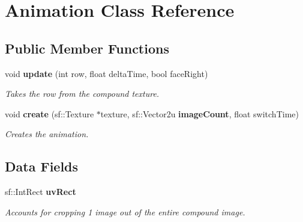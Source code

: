 \section{Animation Class Reference}
\label{classAnimation}
\subsection*{Public Member Functions}
\begin{DoxyCompactItemize}
\item 
void {\bf update} (int row, float delta\+Time, bool face\+Right)
\begin{DoxyCompactList}\small\item\em Takes the row from the compound texture. \end{DoxyCompactList}\item 
void {\bf create} (sf\+::\+Texture $\ast$texture, sf\+::\+Vector2u {\bf image\+Count}, float switch\+Time)
\begin{DoxyCompactList}\small\item\em Creates the animation. \end{DoxyCompactList}\end{DoxyCompactItemize}
\subsection*{Data Fields}
\begin{DoxyCompactItemize}
\item 
sf\+::\+Int\+Rect {\bf uv\+Rect}\label{classAnimation_a82c41dd15d9a98ecc0699ecca09fd056}

\begin{DoxyCompactList}\small\item\em Accounts for cropping 1 image out of the entire compound image. \end{DoxyCompactList}\end{DoxyCompactItemize}
